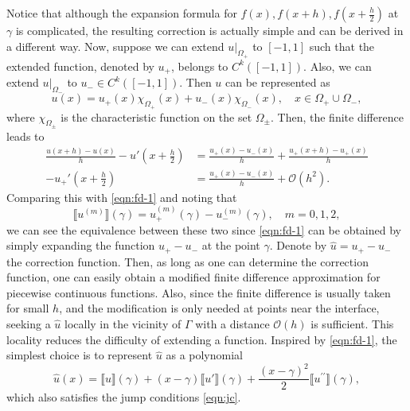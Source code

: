 \documentclass[preprint,11pt]{elsarticle}
\theoremstyle{remark}
\newcommand{\paren}[1]{\left(#1\right)}
\newcommand{\jump}[1]{\llbracket#1\rrbracket}
\newcommand{\at}[2]{\left. #1 \right|_{#2}}
\newcommand{\wh}[1]{\widehat{#1}}
\begin{document}
Notice that although the expansion formula for $f(x), f(x+h), f\paren{x+\frac{h}{2}}$ at $\gamma$ is complicated, the resulting correction is actually simple and can be derived in a different way. Now, suppose we can extend $\at{u}{\Omega_+}$ to $[-1,1]$ such that the extended function, denoted by $u_+$, belongs to $C^{k}([-1,1])$. Also, we can extend $\at{u}{\Omega_-}$ to $u_-\in C^{k}([-1,1])$. Then $u$ can be represented as
\begin{equation}
    u(x) = u_+(x) \chi_{\Omega_+}(x) + u_-(x) \chi_{\Omega_-}(x), \quad x\in \Omega_+\cup\Omega_-,
\end{equation}
where $\chi_{\Omega_\pm}$ is the characteristic function on the set $\Omega_\pm$.
Then, the finite difference leads to
\begin{equation}\label{eqn:fd-2}
\begin{aligned}
    \frac{u(x+h) - u(x)}{h} - u'\paren{x+\frac{h}{2}} &= \frac{u_+(x)- u_-(x)}{h} + \frac{u_+(x+h) - u_+(x)}{h} \\
     - u_+'\paren{x+\frac{h}{2}} &= \frac{u_+(x)- u_-(x)}{h} + \mathcal{O}(h^2).
\end{aligned}
\end{equation}
Comparing this with \eqref{eqn:fd-1} and noting that
\begin{equation}\label{eqn:jc}
    \jump{u^{(m)}}(\gamma) = u_+^{(m)}(\gamma) - u_-^{(m)}(\gamma),\quad m=0,1,2,
\end{equation}
we can see the equivalence between these two since \eqref{eqn:fd-1} can be obtained by simply expanding the function $u_+ - u_-$ at the point $\gamma$.
Denote by $\wh u = u_+ - u_-$ the correction function. Then, as long as one can determine the correction function, one can easily obtain a modified finite difference approximation for piecewise continuous functions. Also, since the finite difference is usually taken for small $h$, and the modification is only needed at points near the interface, seeking a $\wh u$ locally in the vicinity of $\Gamma$ with a distance $\mathcal{O}(h)$ is sufficient. This locality reduces the difficulty of extending a function. Inspired by \eqref{eqn:fd-1}, the simplest choice is to represent $\wh u$ as a polynomial
\begin{equation}
    \wh u(x) = \jump{u}(\gamma) + (x-\gamma) \jump{u'}(\gamma) + \frac{(x-\gamma)^2}{2}\jump{u^{\prime\prime}}(\gamma),
\end{equation}
which also satisfies the jump conditions \eqref{eqn:jc}.
\end{document}
